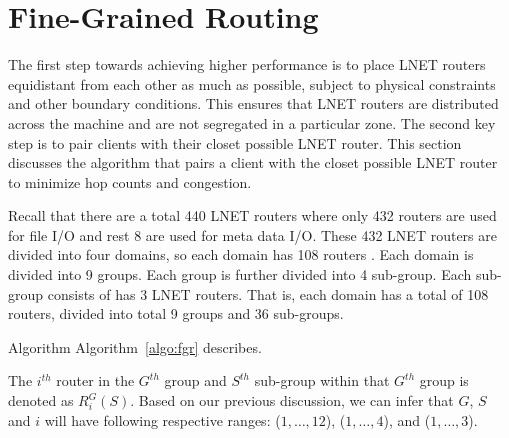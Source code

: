 \section{Fine-Grained Routing}


The first step towards achieving higher performance is to place LNET routers equidistant from each other as much as possible,
subject to physical constraints and other boundary conditions. This ensures that LNET routers are distributed across the machine
and are not segregated in a particular zone. The second key step is to pair clients with their closet possible LNET router. This 
section discusses the algorithm that pairs a client with the closet possible LNET router to minimize hop counts and congestion.

Recall that there are a total 440 LNET routers where only 432 routers are used for file I/O and rest 8 are used for meta data I/O.
These 432 LNET routers are divided into four domains, so each domain has 108 routers . Each
domain is divided into 9 groups. Each group is further divided into 4 sub-group. Each sub-group consists of has 3 LNET routers. That 
is, each domain has a total of 108 routers, divided into total 9 groups and 36 sub-groups.

Algorithm
Algorithm~\ref{algo:fgr} describes.

The $i^{th}$ router in the $G^{th}$ group and $S^{th}$ sub-group within that  $G^{th}$ group is denoted as $R^G_{i}(S)$. Based on 
our previous discussion, we can infer that $G$, $S$ and $i$ will have following respective ranges: ($1, \dots, 12$), ($1, \dots, 4$), 
and ($1, \dots, 3$).



